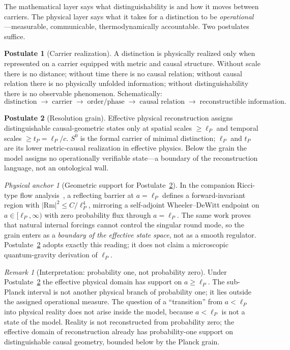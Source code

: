 \documentclass[11pt,a4paper]{article}
\theoremstyle{definition}
\newtheorem{postulate}{Postulate}
\theoremstyle{remark}
\newtheorem{remark}[theorem]{Remark}
\newtheorem{anchor}[theorem]{Physical anchor}
\newcommand{\Szero}{S^{0}}
\newcommand{\lP}{\ell_{P}}
\newcommand{\tP}{t_{P}}
\begin{document}
The mathematical layer says what distinguishability is and how it moves between carriers.  The
physical layer says what it takes for a distinction to be \emph{operational}---measurable,
communicable, thermodynamically accountable.  Two postulates suffice.

\begin{postulate}[Carrier realization]
\label{post:carrier}
A distinction is physically realized only when represented on a carrier equipped with metric and
causal structure.  Without scale there is no distance; without time there is no causal relation;
without causal relation there is no physically unfolded information; without distinguishability
there is no observable phenomenon.  Schematically:
\begin{equation}
\text{distinction}\;\to\;\text{carrier}\;\to\;\text{order/phase}\;\to\;\text{causal relation}
\;\to\;\text{reconstructible information}.
\label{eq:chain}
\end{equation}
\end{postulate}

\begin{postulate}[Resolution grain]
\label{post:grain}
Effective physical reconstruction assigns distinguishable causal-geometric states only at
spatial scales $\ge\lP$ and temporal scales $\ge\tP=\lP/c$.  $\Szero$ is the formal carrier of
minimal distinction; $\lP$ and $\tP$ are its lower metric-causal realization in effective
physics.  Below the grain the model assigns no operationally verifiable state---a boundary of
the reconstruction language, not an ontological wall.
\end{postulate}

\begin{anchor}[Geometric support for Postulate~\ref{post:grain}]
In the companion Ricci-type flow analysis~\cite{BP2026ricci}, a reflecting barrier at
$a=\lP$ defines a forward-invariant region with $|\mathrm{Rm}|^{2}\le C/\lP^{4}$, mirroring a
self-adjoint Wheeler--DeWitt endpoint on $a\in[\lP,\infty)$ with zero probability flux through
$a=\lP$.  The same work proves that natural internal forcings cannot control the singular round
mode, so the grain enters as a \emph{boundary of the effective state space}, not as a smooth
regulator.  Postulate~\ref{post:grain} adopts exactly this reading; it does not claim a
microscopic quantum-gravity derivation of $\lP$.
\end{anchor}

\begin{remark}[Interpretation: probability one, not probability zero]
Under Postulate~\ref{post:grain} the effective physical domain has support on $a\ge\lP$.  The
sub-Planck interval is not another physical branch of probability one; it lies outside the
assigned operational measure.  The question of a ``transition'' from $a<\lP$ into physical
reality does not arise inside the model, because $a<\lP$ is not a state of the model.  Reality
is not reconstructed from probability zero; the effective domain of reconstruction already has
probability-one support on distinguishable causal geometry, bounded below by the Planck grain.
\end{remark}
\end{document}
